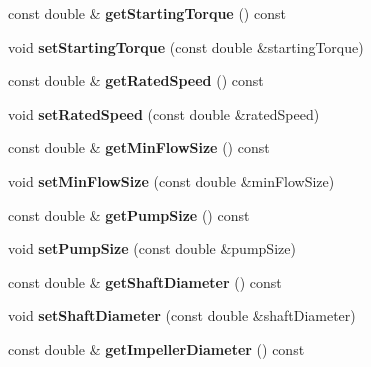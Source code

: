 \begin{DoxyCompactItemize}
\mbox{\label{class_pump_data_a238959072133f28215a67a040e0e8c59}} 
const double \& {\bfseries get\+Starting\+Torque} () const
\item 
\mbox{\label{class_pump_data_ab9f57e48bce20aa143c6bd5ea2bf9983}} 
void {\bfseries set\+Starting\+Torque} (const double \&starting\+Torque)
\item 
\mbox{\label{class_pump_data_aa57c2b86d5f0069c0fee8c62b9ed15cd}} 
const double \& {\bfseries get\+Rated\+Speed} () const
\item 
\mbox{\label{class_pump_data_a449445539a72297703ac35412eb30341}} 
void {\bfseries set\+Rated\+Speed} (const double \&rated\+Speed)
\item 
\mbox{\label{class_pump_data_ad855af8e5a613b3d9fe06388e5912b6a}} 
const double \& {\bfseries get\+Min\+Flow\+Size} () const
\item 
\mbox{\label{class_pump_data_aaa93301e7df64b058fe9733922d6821e}} 
void {\bfseries set\+Min\+Flow\+Size} (const double \&min\+Flow\+Size)
\item 
\mbox{\label{class_pump_data_abc8c5a11fb7ee13ca4daad5b63eb4795}} 
const double \& {\bfseries get\+Pump\+Size} () const
\item 
\mbox{\label{class_pump_data_a1a105017884ea02995e1280b10b23c7e}} 
void {\bfseries set\+Pump\+Size} (const double \&pump\+Size)
\item 
\mbox{\label{class_pump_data_a6c00d6e0070e0baf6f79dc22b35c03b3}} 
const double \& {\bfseries get\+Shaft\+Diameter} () const
\item 
\mbox{\label{class_pump_data_a3c8ffaa8892c288cb5c0633a95e6a177}} 
void {\bfseries set\+Shaft\+Diameter} (const double \&shaft\+Diameter)
\item 
\mbox{\label{class_pump_data_ae048ad8509defdefd1466af6610c6eaf}} 
const double \& {\bfseries get\+Impeller\+Diameter} () const
\item 

\end{DoxyCompactItemize}
